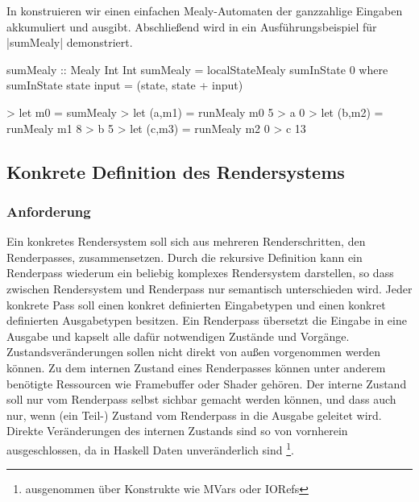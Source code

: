 In  konstruieren wir einen einfachen Mealy-Automaten der ganzzahlige Eingaben akkumuliert und ausgibt. Abschließend wird in  ein Ausführungsbeispiel für |sumMealy| demonstriert.

\begin{haskell}[label={lst:state-mealy-beispiel},caption={[Beispiel Mealy-Automat mit lokalem Zustand]Beispiel Mealy-Automat mit lokalem Zustand}]
sumMealy :: Mealy Int Int
sumMealy = localStateMealy sumInState 0 where
	sumInState state input = (state, state + input)
\end{haskell}

\begin{haskell}[label={lst:state-mealy-ausfuehrung},nolol,caption={Ausführung Mealy-Automat mit lokalem Zustand}]
> let m0 = sumMealy
> let (a,m1) = runMealy m0 5
> a
0
> let (b,m2) = runMealy m1 8
> b
5
> let (c,m3) = runMealy m2 0
> c
13
\end{haskell}

\subsection{Konkrete Definition des Rendersystems}
\label{sec:konkret-rendersystem}

\subsubsection{Anforderung}
Ein konkretes Rendersystem soll sich aus mehreren  Renderschritten, den Renderpasses, zusammensetzen. Durch die rekursive Definition kann ein Renderpass wiederum ein beliebig komplexes Rendersystem darstellen, so dass zwischen Rendersystem und Renderpass nur semantisch unterschieden wird. Jeder konkrete Pass soll einen konkret definierten Eingabetypen und einen konkret definierten Ausgabetypen besitzen. Ein Renderpass übersetzt die Eingabe in eine Ausgabe und kapselt alle dafür notwendigen Zustände und Vorgänge. Zustandsveränderungen sollen nicht direkt von außen vorgenommen werden können. Zu dem internen Zustand eines Renderpasses können unter anderem benötigte Ressourcen wie Framebuffer oder Shader gehören. Der interne Zustand soll nur vom Renderpass selbst sichbar gemacht werden können, und dass auch nur, wenn (ein Teil-) Zustand vom Renderpass in die Ausgabe geleitet wird. Direkte Veränderungen des internen Zustands sind so von vornherein ausgeschlossen, da in Haskell Daten unveränderlich sind \footnote{ausgenommen über Konstrukte wie MVars oder IORefs}.

